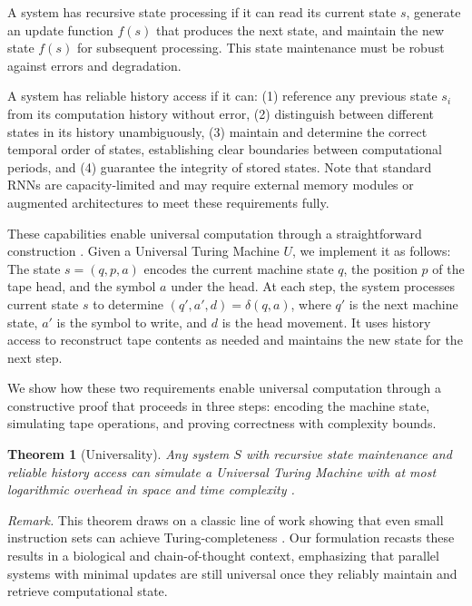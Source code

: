 \documentclass[12pt]{article}
\newtheorem{theorem}{Theorem}
\begin{document}
A system has recursive state processing if it can read its current state $s$, generate an update function $f(s)$ that produces the next state, and maintain the new state $f(s)$ for subsequent processing.
This state maintenance must be robust against errors and degradation.

A system has reliable history access if it can: (1) reference any previous state $s_i$ from its computation history without error, (2) distinguish between different states in its history unambiguously, (3) maintain and determine the correct temporal order of states, establishing clear boundaries between computational periods, and (4) guarantee the integrity of stored states. Note that standard RNNs are capacity-limited and may require external memory modules or augmented architectures to meet these requirements fully.

These capabilities enable universal computation through a straightforward construction \cite{sipser1996introduction,deutsch1995universality,bennett1989time}.
Given a Universal Turing Machine $U$, we implement it as follows: The state $s = (q, p, a)$ encodes the current machine state $q$, the position $p$ of the tape head, and the symbol $a$ under the head.
At each step, the system processes current state $s$ to determine $(q', a', d) = \delta(q, a)$, where $q'$ is the next machine state, $a'$ is the symbol to write, and $d$ is the head movement.
It uses history access to reconstruct tape contents as needed and maintains the new state for the next step.

We show how these two requirements enable universal computation through a constructive proof that proceeds in three steps: encoding the machine state, simulating tape operations, and proving correctness with complexity bounds.

\vspace{1em}

\begin{theorem}[Universality]
Any system $S$ with recursive state maintenance and reliable history access can simulate a Universal Turing Machine with at most logarithmic overhead in space and time complexity \cite{boyle2024memory,liskiewicz1994complexity}.
\end{theorem}

\textit{Remark.}
This theorem draws on a classic line of work showing that even small instruction sets can achieve Turing-completeness \cite{savage1994space,deutsch1995universality,bennett1989time}.
Our formulation recasts these results in a biological and chain-of-thought context, emphasizing that parallel systems with minimal updates are still universal once they reliably maintain and retrieve computational state.
\end{document}
